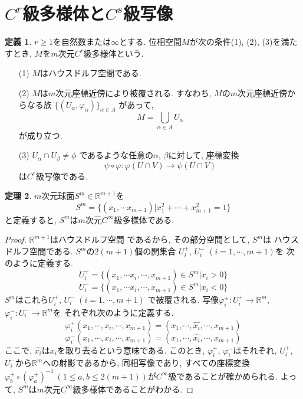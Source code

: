 \documentclass[twocolumn]{jarticle}
\theoremstyle{definition}
\newtheorem{theorem}{定理}[section]
\newtheorem{definition}[theorem]{定義}
\begin{document}
\section{$C^r$級多様体と$C^s$級写像}
\begin{definition}\label{def:C^r manifold}
  $r\geq 1$を自然数または$\infty$とする. 
  位相空間$M$が次の条件(1), (2), (3)を満たすとき, 
  $M$を$m$次元$C^r$級多様体という.
  \begin{itemize}
      \item[(1)]$M$はハウスドルフ空間である.
      \item[(2)]$M$は$m$次元座標近傍により被覆される. 
      すなわち, $M$の$m$次元座標近傍からなる族
      $\{(U_\alpha, \varphi_\alpha)\}_{\alpha \in A}$
      があって, 
      $$M = \bigcup_{\alpha \in A}U_\alpha$$
      が成り立つ. 
      \item[(3)]$U_\alpha \cap U_\beta \neq \phi$
      であるような任意の$\alpha$, $\beta$に対して, 座標変換
      $$\psi \circ \varphi:\varphi(U\cap V)\rightarrow \psi(U\cap V)$$
      は$C^r$級写像である. 
  \end{itemize}
\end{definition}
\begin{theorem}
  $m$次元球面$S^m \in \mathbb{R}^{m+1}$を
  $$S^m=\{(x_1,\cdots x_{m+1})|x_1^2+\cdots +x_{m+1}^2=1\}$$
  と定義すると, $S^m$は$m$次元$C^{\infty}$級多様体である. 
\end{theorem}
\begin{proof}
  $\mathbb{R}^{m+1}$はハウスドルフ空間
      であるから, その部分空間として, $S^m$は
      ハウスドルフ空間である. 
      $S^m$の$2(m+1)$個の開集合
      $U_i^+$, $U_i^-$ $(i=1,\cdots ,m+1)$を
      次のように定義する. 
      $$U_i^+ = \{(x_1, \cdots x_i, \cdots ,x_{m+1})\in S^m|x_i>0\}$$
      $$U_i^- = \{(x_1, \cdots x_i, \cdots ,x_{m+1})\in S^m|x_i<0\}$$
      $S^m$はこれら$U_i^+$, $U_i^-$ $(i=1,\cdots ,m+1)$
      で被覆される. 写像$\varphi_i^+:U_i^+ \rightarrow \mathbb{R}^m$, 
      $\varphi_i^-:U_i^- \rightarrow \mathbb{R}^m$を
      それぞれ次のように定義する. 
      $$\varphi_i^+(x_1,\cdots ,x_i,\cdots, x_{m+1})=(x_1,\cdots ,\hat{x_i},\cdots ,x_{m+1})$$
      $$\varphi_i^-(x_1,\cdots ,x_i,\cdots, x_{m+1})=(x_1,\cdots ,\hat{x_i},\cdots ,x_{m+1})$$
      ここで, $\hat{x_i}$は$x_i$を取り去るという意味である. このとき, 
      $\varphi_i^+$, $\varphi_i^-$はそれぞれ, $U_i^+$, 
      $U_i^-$から$\mathbb{R}^m$への射影であるから, 同相写像であり, 
      すべての座標変換$\varphi_b^+\circ(\varphi_a^+)^{-1}\ 
      (1\leq a, b\leq 2(m+1))$が$C^{\infty}$級であることが確かめられる. 
      よって, $S^m$は$m$次元$C^{\infty}$級多様体であることがわかる. 
\end{proof}
\end{document}

